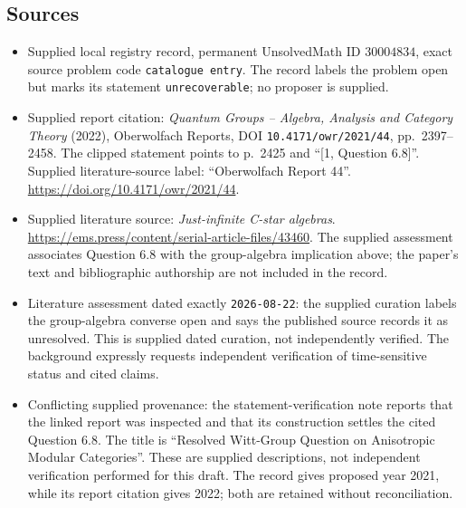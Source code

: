 \documentclass[11pt]{article}
\begin{document}
\subsection{Sources}
\begin{itemize}
\item Supplied local registry record, permanent UnsolvedMath ID \(30004834\), exact source problem code \texttt{catalogue entry}. The record labels the problem open but marks its statement \texttt{unrecoverable}; no proposer is supplied.
\item Supplied report citation: \emph{Quantum Groups -- Algebra, Analysis and Category Theory} (2022), Oberwolfach Reports, DOI \texttt{10.4171/owr/2021/44}, pp.~2397--2458. The clipped statement points to p.~2425 and ``[1, Question 6.8]''. Supplied literature-source label: ``Oberwolfach Report 44''. \url{https://doi.org/10.4171/owr/2021/44}.
\item Supplied literature source: \emph{Just-infinite C-star algebras}. \url{https://ems.press/content/serial-article-files/43460}. The supplied assessment associates Question 6.8 with the group-algebra implication above; the paper's text and bibliographic authorship are not included in the record.
\item Literature assessment dated exactly \texttt{2026-08-22}: the supplied curation labels the group-algebra converse open and says the published source records it as unresolved. This is supplied dated curation, not independently verified. The background expressly requests independent verification of time-sensitive status and cited claims.
\item Conflicting supplied provenance: the statement-verification note reports that the linked report was inspected and that its construction settles the cited Question 6.8. The title is ``Resolved Witt-Group Question on Anisotropic Modular Categories''. These are supplied descriptions, not independent verification performed for this draft. The record gives proposed year 2021, while its report citation gives 2022; both are retained without reconciliation.
\end{itemize}
\end{document}
